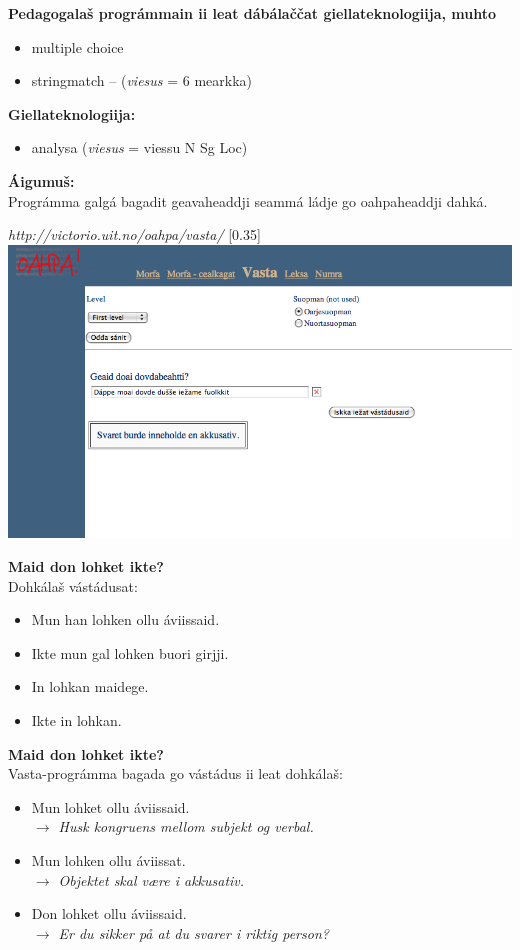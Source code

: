 \documentclass[landscape,norsk,11pt]{seminar}
\begin{document}
\begin{slide}

\newslide
\textbf{Pedagogalaš prográmmain ii leat dábálaččat giellateknologiija, muhto} 
\begin{itemize}
\item multiple choice 
\item stringmatch -- (\textit{viesus} = 6 mearkka) 
\end{itemize}

\textbf{Giellateknologiija:}
\begin{itemize}
\item analysa (\textit{viesus} = viessu N Sg Loc) 
\end{itemize}

\newslide
\textbf{Áigumuš:}\\
Prográmma galgá bagadit geavaheaddji seammá ládje go oahpaheaddji dahká.

\newslide
\textit{http://victorio.uit.no/oahpa/vasta/}
\scalebox{0.35}[0.35]{\includegraphics{img/vasta_jear.png}} 



\newslide
\textbf{Maid don lohket ikte?} \\
Dohkálaš vástádusat:
\begin{itemize}
\item Mun han lohken ollu áviissaid. 
\item Ikte mun gal lohken buori girjji. 
\item In lohkan maidege. 
\item Ikte in lohkan.
\end{itemize}

\newslide
\textbf{Maid don lohket ikte?}\\
Vasta-prográmma bagada go vástádus ii leat dohkálaš:
\begin{itemize}
\item Mun lohket ollu áviissaid. \\ \textit{$\rightarrow$  Husk kongruens mellom subjekt og verbal.}
\item Mun lohken ollu áviissat. \\ \textit{$\rightarrow$ Objektet skal være i akkusativ.}
\item Don lohket ollu áviissaid. \\ \textit{$\rightarrow$ Er du sikker på at du svarer i riktig person?}
\end{itemize}


\end{slide}
\end{document}
